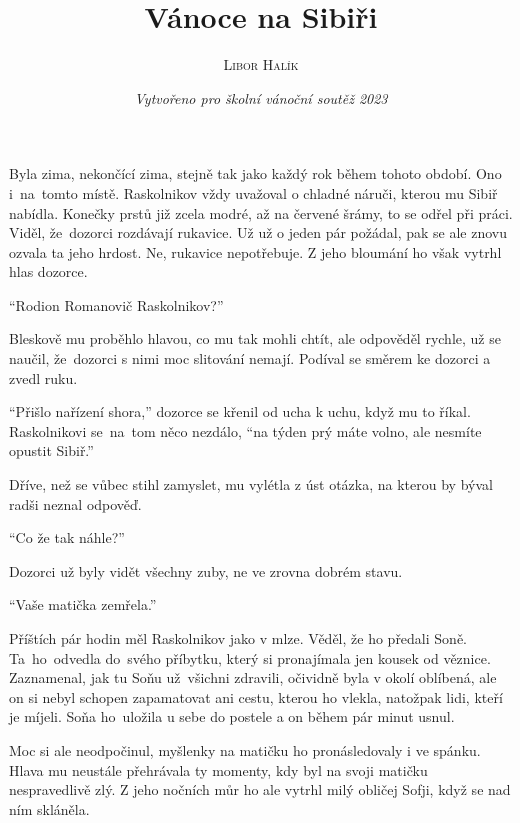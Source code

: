 \documentclass[11pt]{article}
\title{\textbf{Vánoce na Sibiři}}
\author{\textsc{Libor Halík}}
\date{\textit{Vytvořeno pro školní vánoční soutěž 2023}}
\begin{document}
\begin{titlepage}
\maketitle
\thispagestyle{empty}
\end{titlepage}
\newpage

\pagestyle{fancy}
\fancyhf{}
\renewcommand{\headrulewidth}{0.1pt}

Byla zima, nekončící zima, stejně tak jako každý rok během tohoto období. Ono i~na~tomto místě. Raskolnikov vždy uvažoval o chladné náruči, kterou mu Sibiř nabídla. Konečky prstů již zcela modré, až na červené šrámy, to se odřel při práci. Viděl, že~dozorci rozdávají rukavice. Už už o jeden pár požádal, pak se ale znovu ozvala ta jeho hrdost. Ne, rukavice nepotřebuje. Z jeho bloumání ho však vytrhl hlas dozorce.

\enquote{Rodion Romanovič Raskolnikov?}

Bleskově mu proběhlo hlavou, co mu tak mohli chtít, ale odpověděl rychle, už se naučil, že~dozorci s nimi moc slitování nemají. Podíval se směrem ke dozorci a zvedl ruku.

\enquote{Přišlo nařízení shora,} dozorce se křenil od ucha k uchu, když mu to říkal. Raskolnikovi se~na~tom něco nezdálo, \enquote{na týden prý máte volno, ale nesmíte opustit Sibiř.}

Dříve, než se vůbec stihl zamyslet, mu vylétla z úst otázka, na kterou by býval radši neznal odpověď.

\enquote{Co že tak náhle?}

Dozorci už byly vidět všechny zuby, ne ve zrovna dobrém stavu.

\enquote{Vaše matička zemřela.}

\hspace{1em}

Příštích pár hodin měl Raskolnikov jako v mlze. Věděl, že ho předali Soně. Ta~ho~odvedla do~svého příbytku, který si pronajímala jen kousek od věznice. Zaznamenal, jak tu Soňu už~všichni zdravili, očividně byla v okolí oblíbená, ale on si nebyl schopen zapamatovat ani cestu, kterou ho vlekla, natožpak lidi, kteří je míjeli. Soňa ho~uložila u sebe do postele a on během pár minut usnul.

Moc si ale neodpočinul, myšlenky na matičku ho pronásledovaly i ve spánku. Hlava mu neustále přehrávala ty momenty, kdy byl na svoji matičku nespravedlivě zlý. Z jeho nočních můr ho ale vytrhl milý obličej Sofji, když se nad ním skláněla.
\end{document}
